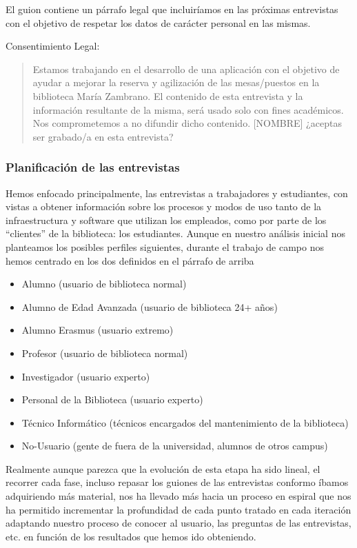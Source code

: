 \documentclass[12pt]{article}
\begin{document}
El guion contiene un párrafo legal que incluiríamos en las próximas entrevistas con el objetivo de respetar los datos de carácter personal en las mismas.

Consentimiento Legal:

\begin{verse}

         Estamos trabajando en el desarrollo de una aplicación con el objetivo de ayudar a mejorar la reserva y agilización de las mesas/puestos en la biblioteca María Zambrano. 
             El contenido de esta entrevista y la información resultante de la misma, será usado solo con fines académicos.
             Nos comprometemos a no difundir dicho contenido. 
[NOMBRE] ¿aceptas ser grabado/a en esta entrevista?

\end{verse}

\subsubsection{Planificación de las entrevistas}

Hemos enfocado principalmente, las entrevistas a trabajadores y estudiantes, con vistas a obtener información sobre los procesos y modos de uso tanto de la infraestructura y software que utilizan los empleados, como por parte de los “clientes” de la biblioteca: los estudiantes.
Aunque en nuestro análisis inicial nos planteamos los posibles perfiles siguientes, durante el trabajo de campo nos hemos centrado en los dos definidos en el párrafo de arriba
\begin{itemize}

\item Alumno (usuario de biblioteca normal) 
\item Alumno de Edad Avanzada (usuario de biblioteca 24+ años) 
\item Alumno Erasmus (usuario extremo) 
\item Profesor (usuario de biblioteca normal) 
\item Investigador (usuario experto) 
\item Personal de la Biblioteca (usuario experto) 
\item Técnico Informático (técnicos encargados del mantenimiento de la biblioteca) 
\item No-Usuario (gente de fuera de la universidad, alumnos de otros campus)

\end{itemize}
Realmente aunque parezca que la evolución de esta etapa ha sido lineal, el recorrer cada fase, incluso repasar los guiones de las entrevistas conformo íbamos adquiriendo más material, nos ha llevado más hacia un proceso en espiral que nos ha permitido incrementar la profundidad de cada punto tratado en cada iteración adaptando nuestro proceso de conocer al usuario, las preguntas de las entrevistas, etc. en función de los resultados que hemos ido obteniendo.
\end{document}
